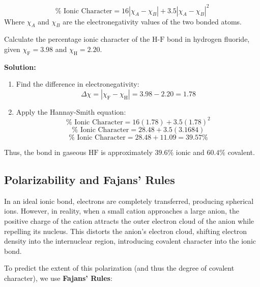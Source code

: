 \documentclass[12pt,a4paper]{article}
\begin{document}
\begin{tcolorbox}[formulabox, title={Hannay-Smith Equation}]
  \[ \% \text{ Ionic Character} = 16 |\chi_A - \chi_B| + 3.5 |\chi_A - \chi_B|^2 \]
  Where $\chi_A$ and $\chi_B$ are the electronegativity values of the two bonded atoms.
\end{tcolorbox}

\begin{tcolorbox}[examplebox, title={Example 5.2: Calculating Ionic Character of Hydrogen Fluoride ($\text{HF}$)}]
  Calculate the percentage ionic character of the $\text{H-F}$ bond in hydrogen fluoride, given $\chi_{\text{F}} = 3.98$ and $\chi_{\text{H}} = 2.20$.
  \par\vspace{4pt}
  \textbf{Solution:}
  \begin{enumerate}
    \item Find the difference in electronegativity:
      \[ \Delta\chi = |\chi_{\text{F}} - \chi_{\text{H}}| = 3.98 - 2.20 = 1.78 \]
    \item Apply the Hannay-Smith equation:
      \[ \% \text{ Ionic Character} = 16 (1.78) + 3.5 (1.78)^2 \]
      \[ \% \text{ Ionic Character} = 28.48 + 3.5 (3.1684) \]
      \[ \% \text{ Ionic Character} = 28.48 + 11.09 = 39.57\% \]
  \end{enumerate}
  Thus, the bond in gaseous $\text{HF}$ is approximately $39.6\%$ ionic and $60.4\%$ covalent.
\end{tcolorbox}

\subsection{Polarizability and Fajans' Rules}
In an ideal ionic bond, electrons are completely transferred, producing spherical ions. However, in reality, when a small cation approaches a large anion, the positive charge of the cation attracts the outer electron cloud of the anion while repelling its nucleus. This distorts the anion's electron cloud, shifting electron density into the internuclear region, introducing covalent character into the ionic bond.

To predict the extent of this polarization (and thus the degree of covalent character), we use \textbf{Fajans' Rules}:
\end{document}
